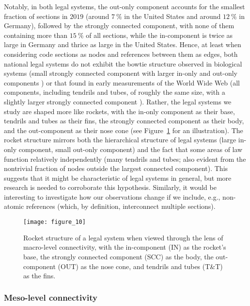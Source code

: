 Notably, in both legal systems, the out-only component accounts for the smallest fraction of sections in $2019$ (around $7~\%$ in the United States and around $12~\%$ in Germany), followed by the strongly connected component, with none of them containing more than $15~\%$ of all sections, while the in-component is twice as large in Germany and thrice as large in the United States.
Hence, at least when considering code sections as nodes and references between them as edges, both national legal systems do not exhibit the bowtie structure observed in biological systems (small strongly connected component with larger in-only and out-only components \cite{friedlander2015}) or that found in early measurements of the World Wide Web (all components, including tendrils and tubes, of roughly the same size, with a slightly larger strongly connected component \cite{broder2000}).
Rather, the legal systems we study are shaped more like rockets, with the in-only component as their base, tendrils and tubes as their fins, the strongly connected component as their body, and the out-component as their nose cone (see Figure~\ref{fig:rocket} for an illustration).
The rocket structure mirrors both the hierarchical structure of legal systems (large in-only component, small out-only component) and the fact that some areas of law function relatively independently (many tendrils and tubes; also evident from the nontrivial fraction of nodes outside the largest connected component). 
This suggests that it might be characteristic of legal systems in general, but more research is needed to corroborate this hypothesis.
Similarly, it would be interesting to investigate how our observations change if we include, e.g., non-atomic references (which, by definition, interconnect multiple sections).

\begin{figure}[h]
	\centering
	\texttt{[image: figure\_10]}
	\caption{Rocket structure of a legal system when viewed through the lens of macro-level connectivity, with the in-component (IN) as the rocket's base, the strongly connected component (SCC) as the body, the out-component (OUT) as the nose cone, and tendrils and tubes (T\&T) as the fins.}\label{fig:rocket}
\end{figure}

\vspace*{12pt}
\subsubsection{Meso-level connectivity}
\label{subsubsec:results:connectivity:meso}

